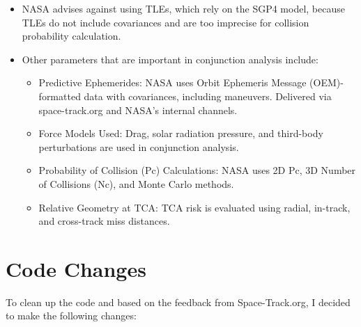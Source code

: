 \documentclass[12pt]{report}
\begin{document}
\begin{enumerate}
  \begin{itemize}
    \item NASA advises against using TLEs, which rely on the SGP4 model, because TLEs do not include covariances and are too imprecise for collision probability calculation.
    \item Other parameters that are important in conjunction analysis include:
    \begin{itemize}
      \item Predictive Ephemerides: NASA uses Orbit Ephemeris Message (OEM)-formatted data with covariances, including maneuvers. Delivered via space-track.org and NASA’s internal channels.
      \item Force Models Used: Drag, solar radiation pressure, and third-body perturbations are used in conjunction analysis.
      \item Probability of Collision (Pc) Calculations: NASA uses 2D Pc, 3D Number of Collisions (Nc), and Monte Carlo methods.
      \item Relative Geometry at TCA: TCA risk is evaluated using radial, in-track, and cross-track miss distances.
    \end{itemize}
  \end{itemize}

\end{enumerate}

\chapter*{Code Changes}

To clean up the code and based on the feedback from Space-Track.org, I decided to make the following changes:
\end{document}
